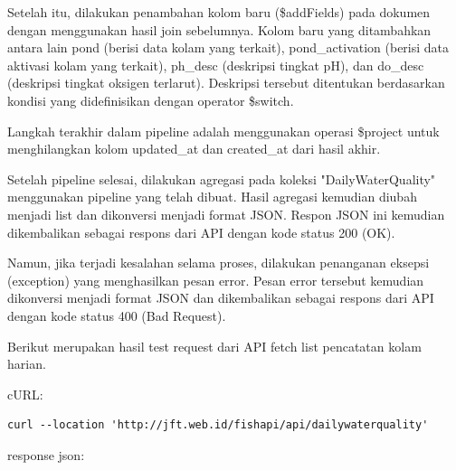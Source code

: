 \begin{enumerate}[1.]
Setelah itu, dilakukan penambahan kolom baru (\$addFields) pada dokumen dengan menggunakan hasil join sebelumnya. Kolom baru yang ditambahkan antara lain pond (berisi data kolam yang terkait), pond\_activation (berisi data aktivasi kolam yang terkait), ph\_desc (deskripsi tingkat pH), dan do\_desc (deskripsi tingkat oksigen terlarut). Deskripsi tersebut ditentukan berdasarkan kondisi yang didefinisikan dengan operator \$switch.

Langkah terakhir dalam pipeline adalah menggunakan operasi \$project untuk menghilangkan kolom updated\_at dan created\_at dari hasil akhir.

Setelah pipeline selesai, dilakukan agregasi pada koleksi "DailyWaterQuality" menggunakan pipeline yang telah dibuat. Hasil agregasi kemudian diubah menjadi list dan dikonversi menjadi format JSON. Respon JSON ini kemudian dikembalikan sebagai respons dari API dengan kode status 200 (OK).

Namun, jika terjadi kesalahan selama proses, dilakukan penanganan eksepsi (exception) yang menghasilkan pesan error. Pesan error tersebut kemudian dikonversi menjadi format JSON dan dikembalikan sebagai respons dari API dengan kode status 400 (Bad Request).

Berikut merupakan hasil test request dari API fetch list pencatatan kolam harian.

cURL:

\begin{lstlisting}
curl --location 'http://jft.web.id/fishapi/api/dailywaterquality'
\end{lstlisting}

response json:


\end{enumerate}
